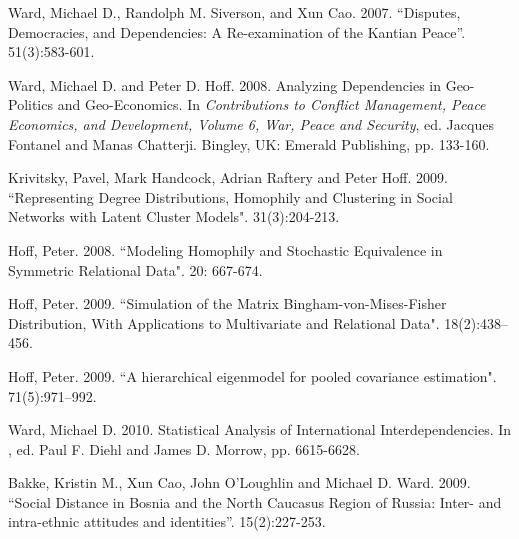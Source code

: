 \documentclass[pdftex,12pt,fullpage,oneside]{amsart}
\begin{document}
\begin{list}{}{\leftmargin=1em} \small
\item Ward, Michael D., Randolph M. Siverson, and Xun Cao. 2007. ``Disputes, Democracies, and Dependencies: A Re-examination of the
  Kantian Peace''.  51(3):583-601.

\item Ward, Michael D. and Peter D. Hoff. 2008. Analyzing
  Dependencies in Geo-Politics and Geo-Economics.  \newblock In \textit{ Contributions to
    Conflict Management, Peace Economics, and Development, Volume 6,
    War, Peace and Security}, ed. Jacques Fontanel and Manas Chatterji. Bingley, UK: Emerald Publishing, pp. 133-160. %

\item Krivitsky, Pavel, Mark Handcock, Adrian Raftery and Peter Hoff. 2009. ``Representing Degree Distributions, Homophily and Clustering in
  Social Networks with Latent Cluster Models".  31(3):204-213.

\item  Hoff, Peter. 2008. ``Modeling Homophily and Stochastic Equivalence in
  Symmetric Relational Data".  20: 667-674.

\item Hoff, Peter. 2009. ``Simulation of the Matrix Bingham-von-Mises-Fisher
  Distribution, With Applications to Multivariate and Relational
  Data".  18(2):438--456.

\item Hoff, Peter. 2009. ``A hierarchical eigenmodel for pooled covariance
  estimation".  71(5):971--992.
  
\item Ward, Michael D. 2010. Statistical Analysis of
  International Interdependencies. In , ed. Paul F. Diehl and
  James D. Morrow, pp. 6615-6628.
  
\item Bakke, Kristin M., Xun Cao, John O'Loughlin and Michael D. Ward. 2009. ``Social Distance in Bosnia and the North Caucasus Region
  of Russia: Inter- and intra-ethnic attitudes and identities''.  15(2):227-253.


\end{list}
\end{document}
